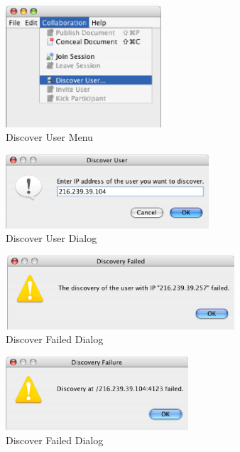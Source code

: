 \documentclass[11pt,a4paper]{article}
\begin{document}
\begin{figure}[H]
\begin{center}
  \includegraphics[height=1.78in, width=2.28in]{../images/usermanual/menu_collab_discover.eps}
\caption{Discover User Menu}
\label{default}
\end{center}
\end{figure}

\begin{figure}[H]
\begin{center}
  \includegraphics[height=1.08in, width=2.98in]{../images/usermanual/ace_discover.eps}
\caption{Discover User Dialog}
\label{default}
\end{center}
\end{figure}

\begin{figure}[H]
\begin{center}
  \includegraphics[height=1.08in, width=3.38in]{../images/usermanual/discover_failed_inv_ip.eps}
\caption{Discover Failed Dialog}
\label{default}
\end{center}
\end{figure}

\begin{figure}[H]
\begin{center}
  \includegraphics[height= 1.08in, width=2.68in]{../images/usermanual/discover_failed_no_ace.eps}
\caption{Discover Failed Dialog}
\label{default}
\end{center}
\end{figure}
\end{document}
